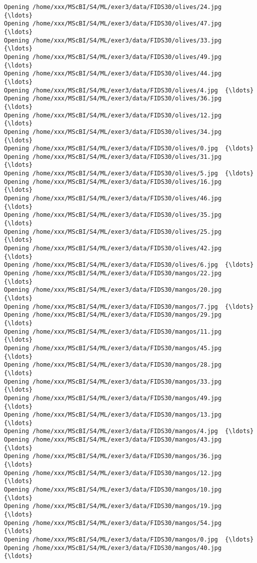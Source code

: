 \documentclass[11pt]{article}
\begin{document}
\begin{Verbatim}[commandchars=\\\{\}]
Opening /home/xxx/MScBI/S4/ML/exer3/data/FIDS30/olives/24.jpg  {\ldots}
Opening /home/xxx/MScBI/S4/ML/exer3/data/FIDS30/olives/47.jpg  {\ldots}
Opening /home/xxx/MScBI/S4/ML/exer3/data/FIDS30/olives/33.jpg  {\ldots}
Opening /home/xxx/MScBI/S4/ML/exer3/data/FIDS30/olives/49.jpg  {\ldots}
Opening /home/xxx/MScBI/S4/ML/exer3/data/FIDS30/olives/44.jpg  {\ldots}
Opening /home/xxx/MScBI/S4/ML/exer3/data/FIDS30/olives/4.jpg  {\ldots}
Opening /home/xxx/MScBI/S4/ML/exer3/data/FIDS30/olives/36.jpg  {\ldots}
Opening /home/xxx/MScBI/S4/ML/exer3/data/FIDS30/olives/12.jpg  {\ldots}
Opening /home/xxx/MScBI/S4/ML/exer3/data/FIDS30/olives/34.jpg  {\ldots}
Opening /home/xxx/MScBI/S4/ML/exer3/data/FIDS30/olives/0.jpg  {\ldots}
Opening /home/xxx/MScBI/S4/ML/exer3/data/FIDS30/olives/31.jpg  {\ldots}
Opening /home/xxx/MScBI/S4/ML/exer3/data/FIDS30/olives/5.jpg  {\ldots}
Opening /home/xxx/MScBI/S4/ML/exer3/data/FIDS30/olives/16.jpg  {\ldots}
Opening /home/xxx/MScBI/S4/ML/exer3/data/FIDS30/olives/46.jpg  {\ldots}
Opening /home/xxx/MScBI/S4/ML/exer3/data/FIDS30/olives/35.jpg  {\ldots}
Opening /home/xxx/MScBI/S4/ML/exer3/data/FIDS30/olives/25.jpg  {\ldots}
Opening /home/xxx/MScBI/S4/ML/exer3/data/FIDS30/olives/42.jpg  {\ldots}
Opening /home/xxx/MScBI/S4/ML/exer3/data/FIDS30/olives/6.jpg  {\ldots}
Opening /home/xxx/MScBI/S4/ML/exer3/data/FIDS30/mangos/22.jpg  {\ldots}
Opening /home/xxx/MScBI/S4/ML/exer3/data/FIDS30/mangos/20.jpg  {\ldots}
Opening /home/xxx/MScBI/S4/ML/exer3/data/FIDS30/mangos/7.jpg  {\ldots}
Opening /home/xxx/MScBI/S4/ML/exer3/data/FIDS30/mangos/29.jpg  {\ldots}
Opening /home/xxx/MScBI/S4/ML/exer3/data/FIDS30/mangos/11.jpg  {\ldots}
Opening /home/xxx/MScBI/S4/ML/exer3/data/FIDS30/mangos/45.jpg  {\ldots}
Opening /home/xxx/MScBI/S4/ML/exer3/data/FIDS30/mangos/28.jpg  {\ldots}
Opening /home/xxx/MScBI/S4/ML/exer3/data/FIDS30/mangos/33.jpg  {\ldots}
Opening /home/xxx/MScBI/S4/ML/exer3/data/FIDS30/mangos/49.jpg  {\ldots}
Opening /home/xxx/MScBI/S4/ML/exer3/data/FIDS30/mangos/13.jpg  {\ldots}
Opening /home/xxx/MScBI/S4/ML/exer3/data/FIDS30/mangos/4.jpg  {\ldots}
Opening /home/xxx/MScBI/S4/ML/exer3/data/FIDS30/mangos/43.jpg  {\ldots}
Opening /home/xxx/MScBI/S4/ML/exer3/data/FIDS30/mangos/36.jpg  {\ldots}
Opening /home/xxx/MScBI/S4/ML/exer3/data/FIDS30/mangos/12.jpg  {\ldots}
Opening /home/xxx/MScBI/S4/ML/exer3/data/FIDS30/mangos/10.jpg  {\ldots}
Opening /home/xxx/MScBI/S4/ML/exer3/data/FIDS30/mangos/19.jpg  {\ldots}
Opening /home/xxx/MScBI/S4/ML/exer3/data/FIDS30/mangos/54.jpg  {\ldots}
Opening /home/xxx/MScBI/S4/ML/exer3/data/FIDS30/mangos/0.jpg  {\ldots}
Opening /home/xxx/MScBI/S4/ML/exer3/data/FIDS30/mangos/40.jpg  {\ldots}

\end{Verbatim}
\end{document}
